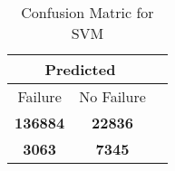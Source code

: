 \begin{table}[] 
\caption{Confusion Matric for SVM} 
\label{Table: Prediction Accuracy-NoneSVM70.0EKF-ignoreReflection-Reflection} 
\centering 
\begin{tabular} 
 {@{}ccc@{}} 
\toprule 
\multicolumn{2}{c}{\textbf{Predicted}}
 \\ \midrule 
\multicolumn{1}{|c|}{Failure} & 
\multicolumn{1}{c|}{No Failure}
 \\ \midrule 
\multicolumn{1}{|c|}{\color{green}\textbf{136884}} & 
\multicolumn{1}{c|}{\color{green}\textbf{22836}}
 \\ \midrule 
\multicolumn{1}{|c|}{\color{red}\textbf{3063}} & 
\multicolumn{1}{c|}{\color{red}\textbf{7345}}
 \\ \bottomrule 
\end{tabular} 
\end{table} 
